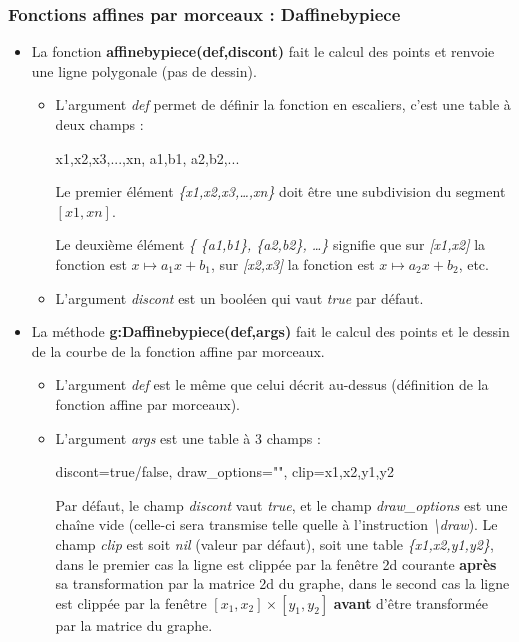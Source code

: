 \subsubsection{Fonctions affines par morceaux : Daffinebypiece}

\begin{itemize}
\item La fonction \textbf{affinebypiece(def,discont)} fait le calcul des points et renvoie une ligne polygonale (pas de dessin).

  \begin{itemize}
  \item  L'argument \emph{def} permet de définir la fonction en escaliers, c'est une table à deux champs :

\begin{TeXcode}
 { {x1,x2,x3,...,xn}, { {a1,b1}, {a2,b2},...} }
\end{TeXcode}

  Le premier élément \emph{\{x1,x2,x3,\ldots,xn\}} doit être une subdivision du segment \([x1,xn]\).
  
  Le deuxième élément \emph{\{ \{a1,b1\}, \{a2,b2\}, \ldots\}} signifie que sur \emph{{[}x1,x2{]}} la fonction est \(x\mapsto a_1x+b_1\), sur \emph{{[}x2,x3{]}} la fonction est
  \(x\mapsto a_2x+b_2\), etc.
  
  \item L'argument \emph{discont} est un booléen qui vaut \emph{true} par défaut.
  \end{itemize}
  
\item La méthode \textbf{g:Daffinebypiece(def,args)} fait le calcul des points et le dessin de la courbe de la fonction affine par morceaux.

  \begin{itemize}
  \item L'argument \emph{def} est le même que celui décrit au-dessus (définition de la fonction affine par morceaux).
  \item L'argument \emph{args} est une table à 3 champs :
  
\begin{TeXcode}
  { discont=true/false, draw_options="", clip={x1,x2,y1,y2} }
\end{TeXcode}

  Par défaut, le champ \emph{discont} vaut \emph{true}, et le champ \emph{draw\_options} est une chaîne vide (celle-ci sera transmise telle quelle à l'instruction \emph{\textbackslash draw}). Le champ \emph{clip} est soit \emph{nil} (valeur par défaut), soit une table \emph{\{x1,x2,y1,y2\}}, dans le premier cas la ligne est clippée par la fenêtre 2d courante \textbf{après} sa transformation par la matrice 2d du graphe, dans le second cas la ligne est clippée par la fenêtre $[x_1,x_2]\times[y_1,y_2]$ \textbf{avant} d'être transformée par la matrice du graphe.
  \end{itemize}
\end{itemize}

